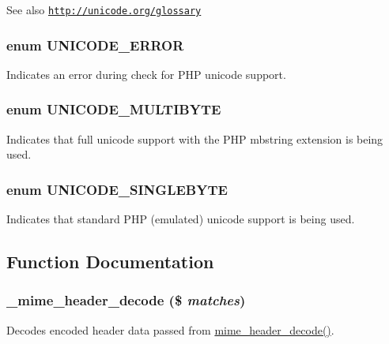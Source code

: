\begin{DoxySeeAlso}{See also}
\href{http://unicode.org/glossary}{\tt http://unicode.org/glossary} 
\end{DoxySeeAlso}
\hypertarget{unicode_8inc_a990de8cbc02e69c8cfe1ac1ec91a8fdc}{
\subsubsection[{UNICODE\_\-ERROR}]{\setlength{\rightskip}{0pt plus 5cm}enum {\bf UNICODE\_\-ERROR}}}
\label{unicode_8inc_a990de8cbc02e69c8cfe1ac1ec91a8fdc}
Indicates an error during check for PHP unicode support. \hypertarget{unicode_8inc_aad231dfcc1dabe13a4d256cf799949e8}{
\subsubsection[{UNICODE\_\-MULTIBYTE}]{\setlength{\rightskip}{0pt plus 5cm}enum {\bf UNICODE\_\-MULTIBYTE}}}
\label{unicode_8inc_aad231dfcc1dabe13a4d256cf799949e8}
Indicates that full unicode support with the PHP mbstring extension is being used. \hypertarget{unicode_8inc_a334f042af88c14fbc70643acda9c77f3}{
\subsubsection[{UNICODE\_\-SINGLEBYTE}]{\setlength{\rightskip}{0pt plus 5cm}enum {\bf UNICODE\_\-SINGLEBYTE}}}
\label{unicode_8inc_a334f042af88c14fbc70643acda9c77f3}
Indicates that standard PHP (emulated) unicode support is being used. 

\subsection{Function Documentation}
\hypertarget{unicode_8inc_a332130b9aa6b66fab3bc19e43a0eacae}{
\subsubsection[{\_\-mime\_\-header\_\-decode}]{\setlength{\rightskip}{0pt plus 5cm}\_\-mime\_\-header\_\-decode (\$ {\em matches})}}
\label{unicode_8inc_a332130b9aa6b66fab3bc19e43a0eacae}
Decodes encoded header data passed from \hyperlink{unicode_8inc_ab925f3117ef3c0d5736c4c38d0346aa3}{mime\_\-header\_\-decode()}.

